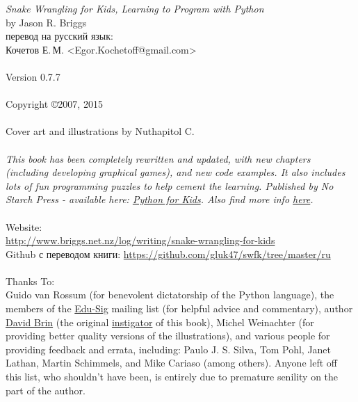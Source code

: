\noindent
\textsf{\emph{Snake Wrangling for Kids, Learning to Program with Python}}\\
by Jason R. Briggs\\
перевод на русский язык:\\
Кочетов Е.\,М. <Egor.Kochetoff@gmail.com>\\
\\
Version 0.7.7
\\\\
Copyright \copyright 2007, 2015\\
\\
Cover art and illustrations by Nuthapitol C.\\
\\
\noindent
\textsf{\emph{This book has been completely rewritten and updated, with new chapters (including developing graphical games), and new code examples. It also includes lots of fun programming puzzles to help cement the learning. Published by No Starch Press - available here: \href{http://nostarch.com/pythonforkids}{Python for Kids}. Also find more info \href{http://jasonrbriggs.com/python-for-kids/}{here}.}}
\\
\\
\linebreak
\noindent
Website:\\ \href{http://www.briggs.net.nz/log/writing/snake-wrangling-for-kids}{http://www.briggs.net.nz/log/writing/snake-wrangling-for-kids}\\
Github с переводом книги: \url{https://github.com/gluk47/swfk/tree/master/ru}\\
\\
\noindent
Thanks To:\\
Guido van Rossum (for benevolent dictatorship of the Python language), the members of the \href{http://www.python.org/community/sigs/current/edu-sig/}{Edu-Sig} mailing list (for helpful advice and commentary), author \href{http://www.davidbrin.com/}{David Brin} (the original \href{http://www.salon.com/tech/feature/2006/09/14/basic/}{instigator} of this book), Michel Weinachter (for providing better quality versions of the illustrations), and various people for providing feedback and errata, including: Paulo J. S. Silva, Tom Pohl, Janet Lathan, Martin Schimmels, and Mike Cariaso (among others).  Anyone left off this list, who shouldn't have been, is entirely due to premature senility on the part of the author.\\

